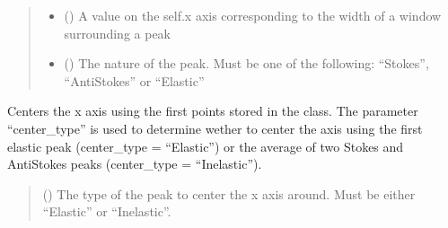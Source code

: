 \documentclass[letterpaper,10pt,english]{sphinxmanual}
\begin{document}
\begin{fulllineitems}
\begin{fulllineitems}
\begin{quote}
\begin{description}
\begin{itemize}
\item {} 
\sphinxAtStartPar
{} () \textendash{} A value on the self.x axis corresponding to the width of a window surrounding a peak

\item {} 
\sphinxAtStartPar
{} () \textendash{} The nature of the peak. Must be one of the following: “Stokes”, “Anti\sphinxhyphen{}Stokes” or “Elastic”

\end{itemize}

\end{description}\end{quote}

\end{fulllineitems}


\begin{fulllineitems}
\label{\detokenize{_autosummary/HDF5_BLS.analyze:HDF5_BLS.analyze.Analyze_VIPA.center_x_axis}}
\pysigstartsignatures
\pysiglinewithargsret
{}
{}
{}
\pysigstopsignatures
\sphinxAtStartPar
Centers the x axis using the first points stored in the class. The parameter “center\_type” is used to determine wether to center the axis using the first elastic peak (center\_type = “Elastic”) or the average of two Stokes and Anti\sphinxhyphen{}Stokes peaks (center\_type = “Inelastic”).
\begin{quote}\begin{description}
\sphinxAtStartPar
{} () \textendash{} The type of the peak to center the x axis around. Must be either “Elastic” or “Inelastic”.

\end{description}\end{quote}

\end{fulllineitems}



\end{fulllineitems}
\end{document}
